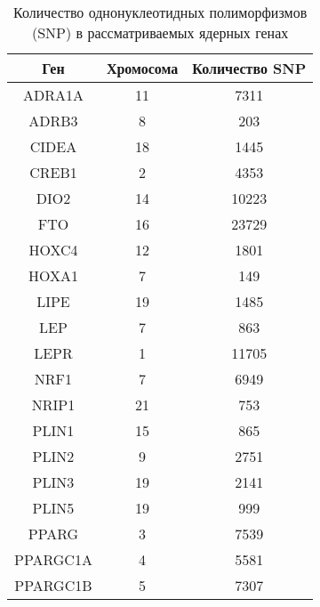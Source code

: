 \begin{table} [htbp]
	\centering
	\begin{threeparttable}
		\caption{Количество однонуклеотидных полиморфизмов (SNP) в рассматриваемых ядерных генах}%
		\label{tab:snp_nuc}%
		\begin{SingleSpace}
			\begin{tabular}{| c | c | c |}
				\hline
				Ген & Хромосома & Количество SNP \\ \hline
				ADRA1A        & 11                  & 7311           \\ \hline
				ADRB3         & 8                   & 203            \\ \hline
				CIDEA         & 18                  & 1445           \\ \hline
				CREB1         & 2                   & 4353           \\ \hline
				DIO2          & 14                  & 10223          \\ \hline
				FTO           & 16                  & 23729          \\ \hline
				HOXC4         & 12                  & 1801           \\ \hline
				HOXA1         & 7                   & 149            \\ \hline
				LIPE          & 19                  & 1485           \\ \hline
				LEP           & 7                   & 863            \\ \hline
				LEPR          & 1                   & 11705          \\ \hline
				NRF1          & 7                   & 6949           \\ \hline
				NRIP1         & 21                  & 753            \\ \hline
				PLIN1         & 15                  & 865            \\ \hline
				PLIN2         & 9                   & 2751           \\ \hline
				PLIN3         & 19                  & 2141           \\ \hline
				PLIN5         & 19                  & 999            \\ \hline
				PPARG         & 3                   & 7539           \\ \hline
				PPARGC1A      & 4                   & 5581           \\ \hline
				PPARGC1B      & 5                   & 7307           \\ \hline

\end{tabular}
\end{SingleSpace}
\end{threeparttable}
\end{table}
